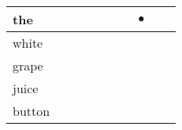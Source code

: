 \documentclass[landscape]{article}
\newcommand{\ssp}{\hspace{2pt}}
\newcommand{\mex}{\cellcolor{g}$\bullet$}
\begin{document}
\begin{tabular}{|l|p{10pt}|p{10pt}|p{10pt}|p{10pt}|p{10pt}|p{10pt}|p{10pt}|p{10pt}|p{10pt}|}
\hline
\ssp \cellcolor{ref6}the \ssp&\hspace{2pt}&\hspace{2pt}&\hspace{2pt}&\hspace{2pt}&\hspace{2pt}&\hspace{2pt}&\hspace{2pt}\mex&\hspace{2pt}&\hspace{2pt}\\
\hline
\ssp white \ssp&\hspace{2pt}&\hspace{2pt}&\hspace{2pt}&\hspace{2pt}&\hspace{2pt}&\hspace{2pt}&\hspace{2pt}&\hspace{2pt}&\hspace{2pt}\\
\hline
\ssp grape \ssp&\hspace{2pt}&\hspace{2pt}&\hspace{2pt}&\hspace{2pt}&\hspace{2pt}&\hspace{2pt}&\hspace{2pt}&\hspace{2pt}&\hspace{2pt}\\
\hline
\ssp juice \ssp&\hspace{2pt}&\hspace{2pt}&\hspace{2pt}&\hspace{2pt}&\hspace{2pt}&\hspace{2pt}&\hspace{2pt}&\hspace{2pt}&\hspace{2pt}\\
\hline
\ssp button \ssp&\hspace{2pt}&\hspace{2pt}&\hspace{2pt}&\hspace{2pt}&\hspace{2pt}&\hspace{2pt}&\hspace{2pt}&\hspace{2pt}&\hspace{2pt}\\

\end{tabular}
\end{document}
